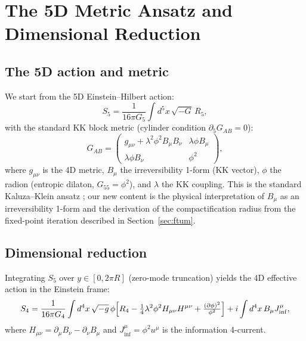 \documentclass[12pt,a4paper]{article}
\newcommand{\Bmu}{B_{\mu}}
\newcommand{\lam}{\lambda}
\begin{document}
\section{The 5D Metric Ansatz and Dimensional Reduction}
\label{sec:kk}

\subsection{The 5D action and metric}

We start from the 5D Einstein--Hilbert action:
\begin{equation}
  S_5 = \frac{1}{16\pi G_5}\int d^5x\,\sqrt{-G}\,R_5 ,
  \label{eq:s5}
\end{equation}
with the standard KK block metric (cylinder condition $\partial_5 G_{AB}=0$):
\begin{equation}
  G_{AB} = \begin{pmatrix} g_{\mu\nu} + \lam^2\phi^2 B_\mu B_\nu & \lam\phi B_\mu \\
                            \lam\phi B_\nu & \phi^2 \end{pmatrix} ,
  \label{eq:metric}
\end{equation}
where $g_{\mu\nu}$ is the 4D metric, $\Bmu$ the irreversibility 1-form (KK
vector), $\phi$ the radion (entropic dilaton, $G_{55}=\phi^2$), and $\lam$
the KK coupling.  This is the standard Kaluza--Klein ansatz
\cite{Kaluza1921,Klein1926}; our new content is the physical interpretation
of $\Bmu$ as an irreversibility 1-form and the derivation of the compactification
radius from the fixed-point iteration described in Section~\ref{sec:ftum}.

\subsection{Dimensional reduction}

Integrating $S_5$ over $y\in[0,2\pi R]$ (zero-mode truncation) yields the
4D effective action in the Einstein frame:
\begin{equation}
  S_4 = \frac{1}{16\pi G_4}\int d^4x\,\sqrt{-g}\,\phi
        \Bigl[R_4 - \tfrac{1}{4}\lam^2\phi^2 H_{\mu\nu}H^{\mu\nu}
              + \tfrac{(\partial\phi)^2}{\phi^2}\Bigr]
        + i\int d^4x\,\Bmu J^\mu_{\inf} ,
  \label{eq:s4}
\end{equation}
where $H_{\mu\nu}=\partial_\mu B_\nu - \partial_\nu B_\mu$ and
$J^\mu_{\inf}=\phi^2 u^\mu$ is the information 4-current.
\end{document}
